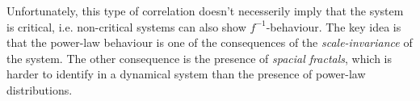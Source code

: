 Unfortunately, this type of correlation doesn't necesserily imply that the system is critical, i.e. non-critical systems can also show $f^{-1}$-behaviour. The key idea is that the power-law behaviour is one of the consequences of the \emph{scale-invariance} of the system. The other consequence is the presence of \emph{spacial fractals}, which is harder to identify in a dynamical system than the presence of power-law distributions.
